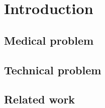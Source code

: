 \section*{Introduction}

\subsection*{Medical problem}

\subsection*{Technical problem}

\subsection*{Related work}